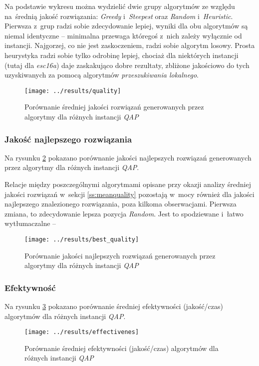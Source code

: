 \documentclass{article}
\begin{document}
			Na podstawie wykresu można wydzielić dwie grupy algorytmów ze względu na~średnią jakość rozwiązania: \emph{Greedy} i~\emph{Steepest} oraz \emph{Random} i~\emph{Heuristic}. Pierwsza z~grup radzi sobie zdecydowanie lepiej, wyniki dla obu algorytmów są niemal identyczne -- minimalna przewaga któregoś z~nich zależy wyłącznie od instancji. Najgorzej, co nie jest zaskoczeniem, radzi sobie algorytm losowy. Prosta heurystyka radzi sobie tylko odrobinę lepiej, chociaż dla niektórych instancji (tutaj dla \emph{esc16a}) daje zaskakująco dobre rezultaty, zbliżone jakościowo do tych uzyskiwanych za pomocą algorytmów \emph{przeszukiwania lokalnego}.


			\begin{figure}[h]
				\texttt{[image: ../results/quality]}
				\caption{Porównanie średniej jakości rozwiązań generowanych przez algorytmy dla różnych instancji \emph{QAP}\label{fig:quality}}
			\end{figure}

		\subsubsection{Jakość najlepszego rozwiązania}

			Na rysunku \ref{fig:best_quality} pokazano porównanie jakości najlepszych rozwiązań generowanych przez algorytmy dla różnych instancji \emph{QAP}.

			Relacje między poszczególnymi algorytmami opisane przy okazji analizy średniej jakości rozwiązań w~sekcji \ref{ss:meanquality} pozostają w~mocy również dla jakości najlepszego znalezionego rozwiązania, poza kilkoma obserwacjami. Pierwsza zmiana, to zdecydowanie lepsza pozycja \emph{Random}. Jest to spodziewane i~łatwo wytłumaczalne -- 

		 	\begin{figure}[h]
				\texttt{[image: ../results/best\_quality]}
				\caption{Porównanie jakości najlepszych rozwiązań generowanych przez algorytmy dla różnych instancji \emph{QAP}\label{fig:best_quality}}
			\end{figure}

		\subsubsection{Efektywność}Na rysunku \ref{fig:effectivenes} pokazano porównanie średniej efektywności (jakość/czas) algorytmów dla różnych instancji \emph{QAP}.
			\begin{figure}[h]
				\texttt{[image: ../results/effectivenes]}
				\caption{Porównanie średniej efektywności (jakość/czas) algorytmów dla różnych instancji \emph{QAP}\label{fig:effectivenes}}
			\end{figure}
\end{document}
